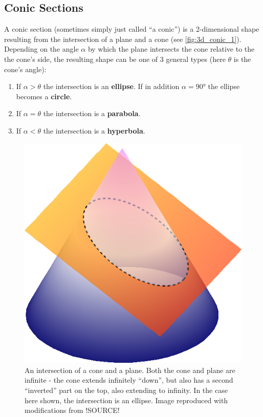 \subsection{Conic Sections}
A conic section (sometimes simply just called \enquote{a conic}) is a 2-dimensional shape resulting from the intersection of a plane and a cone (see \autoref{fig:3d_conic_1}). Depending on the angle $\alpha$ by which the plane intersects the cone relative to the the cone's side, the resulting shape can be one of 3 general types (here $\theta$ is the cone's angle):
\begin{enumerate}
  \item If $\alpha>\theta$ the intersection is an \textbf{ellipse}. If in addition $\alpha=\ang{90}$ the ellipse becomes a \textbf{circle}.
  \item If $\alpha=\theta$ the intersection is a \textbf{parabola}.
  \item If $\alpha<\theta$ the intersection is a \textbf{hyperbola}.
\end{enumerate}

\begin{figure}
  \begin{center}
    \includegraphics[scale=0.65]{figs/mechanics/cone_plane_3d.pdf}
  \end{center}
  \caption{An intersection of a cone and a plane. Both the cone and plane are infinite - the cone extends infinitely \enquote{down}, but also has a second \enquote{inverted} part on the top, also extending to infinity. In the case here shown, the intersection is an ellipse. Image reproduced with modifications from !SOURCE!} %
  \label{fig:3d_conic_1}
\end{figure}

